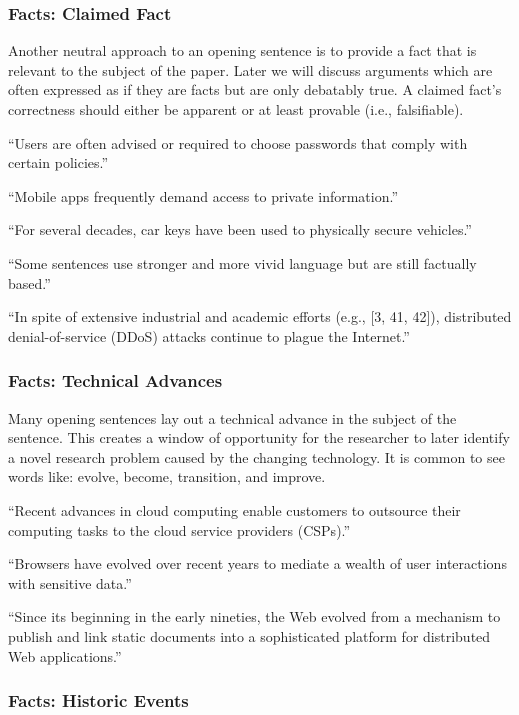 \documentclass[sigconf]{acmart}
\begin{document}
	\subsubsection{Facts: Claimed Fact}
	
	Another neutral approach to an opening sentence is to provide a fact that is relevant to the subject of the paper. Later we will discuss arguments which are often expressed as if they are facts but are only debatably true. A claimed fact’s correctness should either be apparent or at least provable (i.e., falsifiable). 
	
	``Users are often advised or required to choose passwords that comply with certain policies.''
	
	``Mobile apps frequently demand access to private information.''
	
	``For several decades, car keys have been used to physically secure vehicles.''
	
	``Some sentences use stronger and more vivid language but are still factually based.'' 
	
	``In spite of extensive industrial and academic efforts (e.g., [3, 41, 42]), distributed denial-of-service (DDoS) attacks continue to plague the Internet.''
	
	\subsubsection{Facts: Technical Advances}
	
	Many opening sentences lay out a technical advance in the subject of the sentence. This creates a window of opportunity for the researcher to later identify a novel research problem caused by the changing technology.  It is common to see words like: evolve, become, transition, and improve.
	
	``Recent advances in cloud computing enable customers to outsource their computing tasks to the cloud service providers (CSPs).''
	
	``Browsers have evolved over recent years to mediate a wealth of user interactions with sensitive data.''
	
	``Since its beginning in the early nineties, the Web evolved from a mechanism to publish and link static documents into a sophisticated platform for distributed Web applications.''
	
	\subsubsection{Facts: Historic Events}
	
\end{document}
